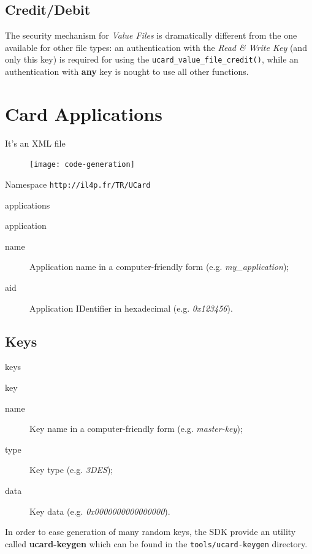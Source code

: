 \documentclass{article}
\begin{document}
\subsection{Credit/Debit}

The security mechanism for \emph{Value Files} is dramatically
different from the one available for other file types: an
authentication with the \emph{Read \& Write Key} (and only this key)
is required for using the \texttt{ucard\_value\_file\_credit()}, while
an authentication with \textbf{any} key is nought to use all other
functions.

\section{Card Applications}


It's an XML file

\begin{figure}[htp]
  \centering
  \texttt{[image: code-generation]}
\end{figure}

Namespace \texttt{http://il4p.fr/TR/UCard}

applications

application
\begin{description}
	\item[name] Application name in a computer-friendly form (e.g.
	\emph{my\_application});
	\item[aid] Application IDentifier in hexadecimal (e.g. \emph{0x123456}).
\end{description}

\subsection{Keys}

keys

key
\begin{description}
	\item[name] Key name in a computer-friendly form (e.g.
	\emph{master-key});
	\item[type] Key type (e.g. \emph{3DES});
	\item[data] Key data (e.g. \emph{0x0000000000000000}).
\end{description}


\begin{note}
In order to ease generation of many random keys, the SDK provide an
utility called \textbf{ucard-keygen} which can be found in the
\texttt{tools/ucard-keygen} directory.
\end{note}
\end{document}
